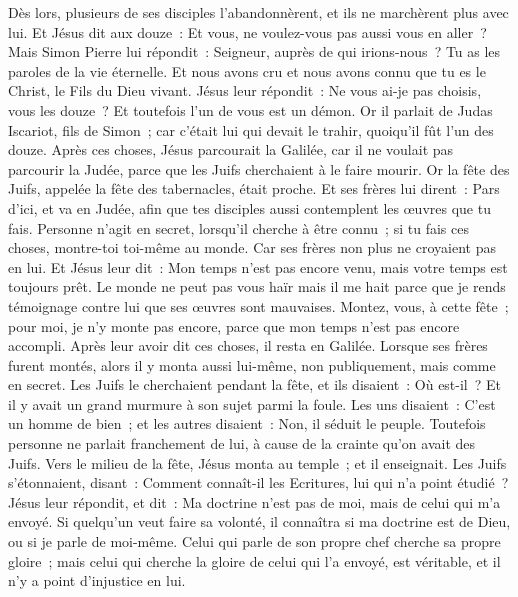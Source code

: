 \begin{multicols}{2}
Dès lors, plusieurs de ses disciples l'abandonnèrent, et ils ne marchèrent plus avec lui.
Et Jésus dit aux douze~: Et vous, ne voulez-vous pas aussi vous en aller~?
Mais Simon Pierre lui répondit~: Seigneur, auprès de qui irions-nous~? Tu as les paroles de la vie éternelle.
Et nous avons cru et nous avons connu que tu es le Christ, le Fils du Dieu vivant.
Jésus leur répondit~: Ne vous ai-je pas choisis, vous les douze~? Et toutefois l'un de vous est un démon.
Or il parlait de Judas Iscariot, fils de Simon~; car c'était lui qui devait le trahir, quoiqu'il fût l'un des douze.
\VerseOne{}Après ces choses, Jésus parcourait la Galilée, car il ne voulait pas parcourir la Judée, parce que les Juifs cherchaient à le faire mourir.
Or la fête des Juifs, appelée la fête des tabernacles, était proche.
Et ses frères lui dirent~: Pars d'ici, et va en Judée, afin que tes disciples aussi contemplent les œuvres que tu fais.
Personne n'agit en secret, lorsqu'il cherche à être connu~; si tu fais ces choses, montre-toi toi-même au monde.
Car ses frères non plus ne croyaient pas en lui.
Et Jésus leur dit~: Mon temps n'est pas encore venu, mais votre temps est toujours prêt.
Le monde ne peut pas vous haïr mais il me hait parce que je rends témoignage contre lui que ses œuvres sont mauvaises.
Montez, vous, à cette fête~; pour moi, je n'y monte pas encore, parce que mon temps n'est pas encore accompli.
Après leur avoir dit ces choses, il resta en Galilée.
Lorsque ses frères furent montés, alors il y monta aussi lui-même, non publiquement, mais comme en secret.
Les Juifs le cherchaient pendant la fête, et ils disaient~: Où est-il~?
Et il y avait un grand murmure à son sujet parmi la foule. Les uns disaient~: C'est un homme de bien~; et les autres disaient~: Non, il séduit le peuple.
Toutefois personne ne parlait franchement de lui, à cause de la crainte qu'on avait des Juifs.
Vers le milieu de la fête, Jésus monta au temple~; et il enseignait.
Les Juifs s'étonnaient, disant~: Comment connaît-il les Ecritures, lui qui n'a point étudié~?
Jésus leur répondit, et dit~: Ma doctrine n'est pas de moi, mais de celui qui m'a envoyé.
Si quelqu'un veut faire sa volonté, il connaîtra si ma doctrine est de Dieu, ou si je parle de moi-même.
Celui qui parle de son propre chef cherche sa propre gloire~; mais celui qui cherche la gloire de celui qui l'a envoyé, est véritable, et il n'y a point d'injustice en lui.

\end{multicols}
